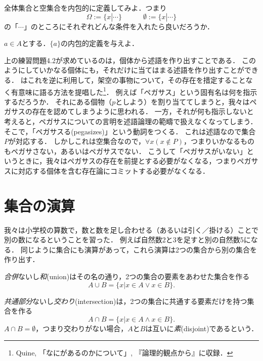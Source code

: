 \documentclass[11pt,a4paper]{jsarticle}
\begin{document}
\begin{exercise}
全体集合と空集合を内包的に定義してみよ．つまり
\[
\Omega := \{ x | \cdots \}  \hspace{3em} \emptyset := \{ x | \cdots \}
\]
の「$\cdots$」のところにそれぞれどんな条件を入れたら良いだろうか． 
\end{exercise}

\begin{exercise}
$a \in A$とする．$\{a\}$の内包的定義を与えよ． 
\end{exercise}

\begin{example}
上の練習問題4.2が求めているのは，個体から述語を作り出すことである．
このようにしていかなる個体にも，それだけに当てはまる述語を作り出すことができる．
\cite{Quine1953-yy}はこれを逆に利用して，架空の事物について，その存在を措定することなく有意味に語る方法を提唱した\footnote{Quine, 「なにがあるのかについて」, 『論理的観点から』に収録．}．
例えば「ペガサス」という固有名は何を指示するだろうか．
それにある個物（$p$としよう）を割り当ててしまうと，我々はペガサスの存在を認めてしまうように思われる．
一方，それが何も指示しないと考えると，ペガサスについての言明を述語論理の範疇で扱えなくなってしまう．
そこで，「ペガサスる(pegasizes)」という動詞をつくる．
これは述語なので集合$P$が対応する．
しかしこれは空集合なので，$\forall x (x \not\in P)$，つまりいかなるものもペガサさない，あるいはペガサスでない．
こうして「ペガサスがいない」というときに，我々はペガサスの存在を前提とする必要がなくなる，つまりペガサスに対応する個体を含む存在論にコミットする必要がなくなる．
\end{example}


\section{集合の演算}
\label{sec:setoperation}
我々は小学校の算数で，数と数を足し合わせる（あるいは引く／掛ける）ことで別の数になるということを習った．
例えば自然数2と3を足すと別の自然数5になる．
同じように集合にも演算があって，これら演算は2つの集合から別の集合を作り出す．

\emph{合併}ないし\emph{和}(union)はその名の通り，2つの集合の要素をあわせた集合を作る
\[
 A \cup B = \{ x | x \in A \vee x \in B\} .
\]


\emph{共通部分}ないし\emph{交わり}(intersection)は，2つの集合に共通する要素だけを持つ集合を作る
\[
 A \cap B = \{ x | x \in A \wedge x \in B\}.
\]
$A \cap B = \emptyset$，つまり交わりがない場合，$A$と$B$は互いに\emph{素}(disjoint)であるという．
\end{document}
